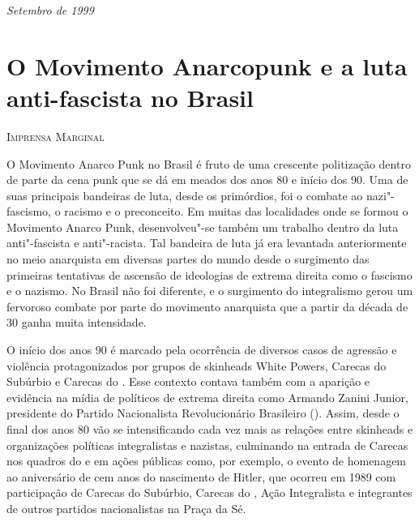 
\hfill{}\emph{Setembro de 1999}


\chapter{O Movimento Anarcopunk e a luta anti-fascista no Brasil}

\hfill{}\textsc{Imprensa Marginal}

\bigskip

O Movimento Anarco Punk no Brasil é fruto de uma crescente politização dentro de parte da cena punk que se dá em meados dos anos 80 e início dos 90. Uma de suas principais bandeiras de luta, desde os primórdios, foi o combate ao nazi"-fascismo, o racismo e o preconceito. Em muitas das localidades onde se formou o Movimento Anarco Punk, desenvolveu"-se também um trabalho dentro da luta anti"-fascista e anti"-racista. Tal bandeira de luta já era levantada anteriormente no meio anarquista em diversas partes do mundo desde o surgimento das primeiras tentativas de ascensão de ideologias de extrema direita como o fascismo e o nazismo. No Brasil não foi diferente, e o surgimento do integralismo gerou um fervoroso combate por parte do movimento anarquista que a partir da década de 30 ganha muita intensidade.

O início dos anos 90 é marcado pela ocorrência de diversos casos de agressão e violência protagonizados por grupos de skinheads White Powers, Carecas do Subúrbio e Carecas do . Esse contexto contava também com a aparição e evidência na mídia de políticos de extrema direita como Armando Zanini Junior, presidente do Partido Nacionalista Revolucionário Brasileiro (). Assim, desde o final dos anos 80 vão se intensificando cada vez mais as relações entre skinheads e organizações políticas integralistas e nazistas, culminando na entrada de Carecas nos quadros do  e em ações públicas como, por exemplo, o evento de homenagem ao aniversário de cem anos do nascimento de Hitler, que ocorreu em 1989 com participação de Carecas do Subúrbio, Carecas do , Ação Integralista e integrantes de outros partidos nacionalistas na Praça da Sé.

